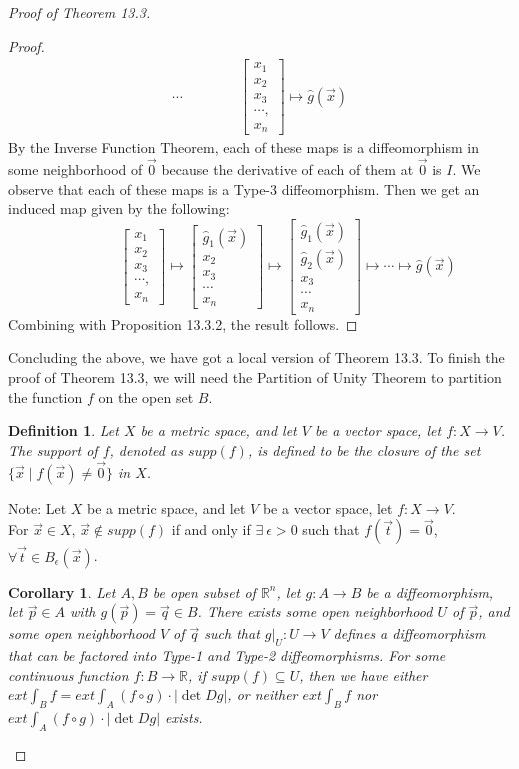 \documentclass[11pt,oneside]{book}
\theoremstyle{break}
\theoremstyle{break}
\newtheorem{corT}[lem]{Corollary}
\newtheorem{defn}{Definition}[corL]
\newcommand{\R}{\mathbb{R}}
\newcommand{\bmat}[1]{\begin{bmatrix} #1 \end{bmatrix}}
\newcommand{\note}{\color{red}Note: \color{black}}
\begin{document}
\begin{proof}[Proof of Theorem 13.3]
\begin{proof}
\begin{align*}
\cdots \qquad\qquad
\bmat{x_1\\x_2\\x_3\\\cdots,\\x_n} \mapsto \hat{g}(\vec{x})
\end{align*}
By the Inverse Function Theorem, each of these maps is a diffeomorphism in some neighborhood of $\vec{0}$ because the derivative of each of them at $\vec{0}$ is $I$. We observe that each of these maps is a Type-3 diffeomorphism. Then we get an induced map given by the following:
$$\qquad\qquad\bmat{x_1\\x_2\\x_3\\\cdots,\\x_n} \mapsto \bmat{\hat{g}_1(\vec{x})\\x_2\\x_3\\\cdots \\x_n} \mapsto \bmat{\hat{g}_1(\vec{x})\\\hat{g}_2(\vec{x})\\x_3\\\cdots\\ x_n} \mapsto
\cdots \mapsto \hat{g}(\vec{x})$$
Combining with Proposition 13.3.2, the result follows.
\end{proof}

Concluding the above, we have got a local version of Theorem 13.3. To finish the proof of Theorem 13.3, we will need the Partition of Unity Theorem to partition the function $f$ on the open set $B$.

\begin{defn}
Let $X$ be a metric space, and let $V$ be a vector space, let $f:X \to V$. \\
The support of $f$, denoted as $supp(f)$, is defined to be the closure of the set $\{\vec{x}\mid f(\vec{x}) \neq \vec{0}\}$ in $X$.
\end{defn}

\note Let $X$ be a metric space, and let $V$ be a vector space, let $f:X \to V$. \\For $\vec{x}\in X$, $\vec{x}\notin supp(f)$ if and only if $\exists\ \epsilon > 0$ such that $f(\vec{t}) = \vec{0}$, $\forall \vec{t}\in B_\epsilon(\vec{x})$. 

\begin{corT}\setlength{\leftskip}{1cm}
Let $A,B$ be open subset of $\R^n$, let $g:A \to B$ be a diffeomorphism, let $\vec{p}\in A$ with $g(\vec{p}) = \vec{q}\in B$. There exists some open neighborhood $U$ of $\vec{p}$, and some open neighborhood $V$ of $\vec{q}$ such that $g|_U:U \to V$ defines a diffeomorphism that can be factored into Type-1 and Type-2 diffeomorphisms. For some continuous function $f:B \to \R$, if $supp(f) \subseteq U$, then we have either $ext \int_B f = ext \int_A (f\circ g) \cdot |\det Dg|$, or neither $ext \int_B f$ nor $ext \int_A (f\circ g) \cdot |\det Dg|$ exists.
\end{corT}


\end{proof}
\end{document}
